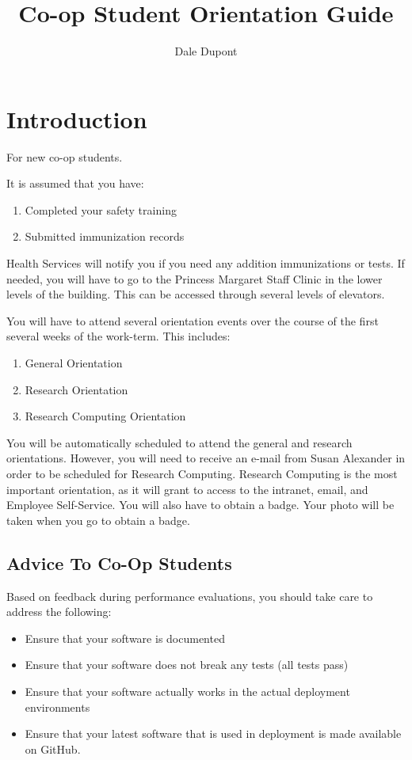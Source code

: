 \documentclass{article}
\title{Co-op Student Orientation Guide}
\author{Dale Dupont}
\begin{document}
\maketitle

\tableofcontents

\newpage

\section{Introduction}

For new co-op students.

It is assumed that you have:
\begin{enumerate}
\item Completed your safety training
\item Submitted immunization records
\end{enumerate}
Health Services will notify you if you need any addition immunizations
or tests. If needed, you will have to go to the Princess Margaret
Staff Clinic in the lower levels of the building. This can be accessed
through several levels of elevators.

You will have to attend several orientation events over the course of the
first several weeks of the work-term. This includes:
\begin{enumerate}
\item General Orientation
\item Research Orientation
\item Research Computing Orientation
\end{enumerate}
You will be automatically scheduled to attend the general and research orientations. However, you will need to receive an e-mail from Susan Alexander in order to be scheduled for Research Computing. Research Computing is the most important orientation, as it will grant to access to the intranet, email,  and Employee Self-Service. You will also have to obtain a badge. Your photo will be taken when you go to obtain a badge. 

\subsection{Advice To Co-Op Students}

Based on feedback during performance evaluations, you should
take care to address the following:

\begin{itemize}
\item Ensure that your software is documented
\item Ensure that your software does not break any tests (all tests pass)
\item Ensure that your software actually works in the actual deployment environments
\item Ensure that your latest software that is used in deployment is made available on GitHub.
\end{itemize}
\end{document}
